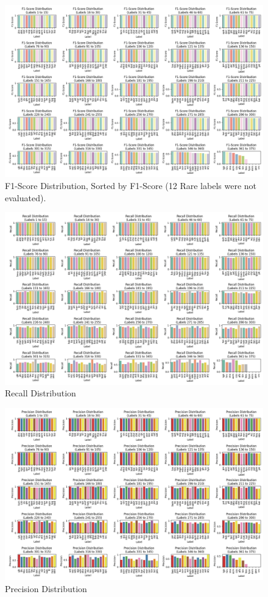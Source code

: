 \documentclass[11pt]{article}
\begin{document}
\begin{figure}[h]
    \centering
    \includegraphics[width=\textwidth]{f1_score_grid.png}
    \caption{F1-Score Distribution, Sorted by F1-Score (12 Rare labels were not evaluated).}
    \label{fig:f1_score_grid}
\end{figure}
\begin{figure}[h]
    \centering
    \includegraphics[width=\textwidth]{recall_grid.png}
    \caption{Recall Distribution}
    \label{fig:recall_score_grid}
\end{figure}
 \begin{figure}[h]
    \centering
    \includegraphics[width=\textwidth]{precision_grid.png}
    \caption{Precision Distribution}
    \label{fig:precision_score_grid}
\end{figure}   
\end{document}
